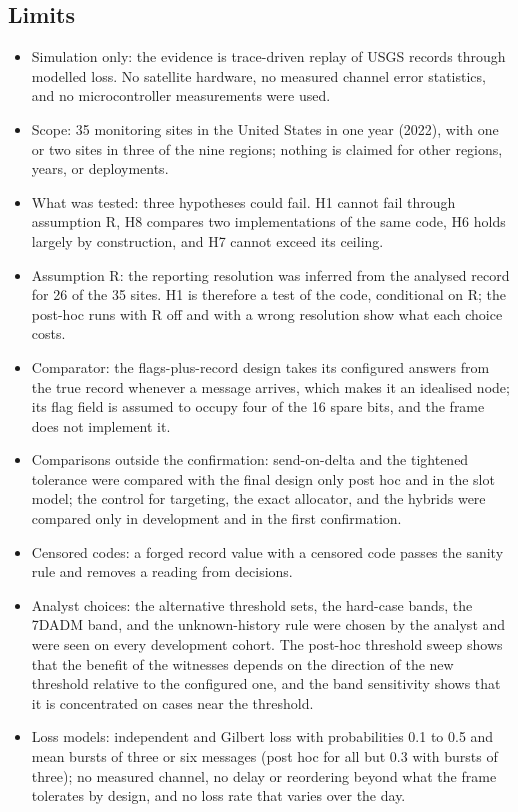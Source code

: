 \subsection{Limits}
\begin{itemize}
  \item Simulation only: the evidence is trace-driven replay of USGS records through modelled loss. No satellite hardware, no measured channel error statistics, and no microcontroller measurements were used.
  \item Scope: 35 monitoring sites in the United States in one year (2022), with one or two sites in three of the nine regions; nothing is claimed for other regions, years, or deployments.
  \item What was tested: three hypotheses could fail. H1 cannot fail through assumption R, H8 compares two implementations of the same code, H6 holds largely by construction, and H7 cannot exceed its ceiling.
  \item Assumption R: the reporting resolution was inferred from the analysed record for 26 of the 35 sites. H1 is therefore a test of the code, conditional on R; the post-hoc runs with R off and with a wrong resolution show what each choice costs.
  \item Comparator: the flags-plus-record design takes its configured answers from the true record whenever a message arrives, which makes it an idealised node; its flag field is assumed to occupy four of the 16 spare bits, and the frame does not implement it.
  \item Comparisons outside the confirmation: send-on-delta and the tightened tolerance were compared with the final design only post hoc and in the slot model; the control for targeting, the exact allocator, and the hybrids were compared only in development and in the first confirmation.
  \item Censored codes: a forged record value with a censored code passes the sanity rule and removes a reading from decisions.
  \item Analyst choices: the alternative threshold sets, the hard-case bands, the 7DADM band, and the unknown-history rule were chosen by the analyst and were seen on every development cohort. The post-hoc threshold sweep shows that the benefit of the witnesses depends on the direction of the new threshold relative to the configured one, and the band sensitivity shows that it is concentrated on cases near the threshold.
  \item Loss models: independent and Gilbert loss with probabilities 0.1 to 0.5 and mean bursts of three or six messages (post hoc for all but 0.3 with bursts of three); no measured channel, no delay or reordering beyond what the frame tolerates by design, and no loss rate that varies over the day.

\end{itemize}
